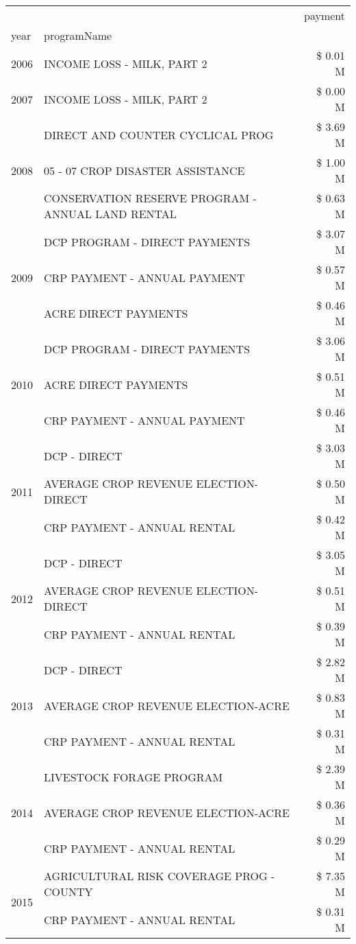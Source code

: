 \begin{tabular}{llr}
\toprule
 &  & payment \\
year & programName &  \\
\midrule
2006 & INCOME LOSS - MILK, PART 2 & \$ 0.01 M \\
\cline{1-3}
2007 & INCOME LOSS - MILK, PART 2 & \$ 0.00 M \\
\cline{1-3}
\multirow[t]{3}{*}{2008} & DIRECT AND COUNTER CYCLICAL PROG & \$ 3.69 M \\
 & 05 - 07 CROP DISASTER ASSISTANCE & \$ 1.00 M \\
 & CONSERVATION RESERVE PROGRAM - ANNUAL LAND RENTAL & \$ 0.63 M \\
\cline{1-3}
\multirow[t]{3}{*}{2009} & DCP PROGRAM - DIRECT PAYMENTS & \$ 3.07 M \\
 & CRP PAYMENT - ANNUAL PAYMENT & \$ 0.57 M \\
 & ACRE DIRECT PAYMENTS & \$ 0.46 M \\
\cline{1-3}
\multirow[t]{3}{*}{2010} & DCP PROGRAM - DIRECT PAYMENTS & \$ 3.06 M \\
 & ACRE DIRECT PAYMENTS & \$ 0.51 M \\
 & CRP PAYMENT - ANNUAL PAYMENT & \$ 0.46 M \\
\cline{1-3}
\multirow[t]{3}{*}{2011} & DCP - DIRECT & \$ 3.03 M \\
 & AVERAGE CROP REVENUE ELECTION-DIRECT & \$ 0.50 M \\
 & CRP PAYMENT - ANNUAL RENTAL & \$ 0.42 M \\
\cline{1-3}
\multirow[t]{3}{*}{2012} & DCP - DIRECT & \$ 3.05 M \\
 & AVERAGE CROP REVENUE ELECTION-DIRECT & \$ 0.51 M \\
 & CRP PAYMENT - ANNUAL RENTAL & \$ 0.39 M \\
\cline{1-3}
\multirow[t]{3}{*}{2013} & DCP - DIRECT & \$ 2.82 M \\
 & AVERAGE CROP REVENUE ELECTION-ACRE & \$ 0.83 M \\
 & CRP PAYMENT - ANNUAL RENTAL & \$ 0.31 M \\
\cline{1-3}
\multirow[t]{3}{*}{2014} & LIVESTOCK FORAGE PROGRAM & \$ 2.39 M \\
 & AVERAGE CROP REVENUE ELECTION-ACRE & \$ 0.36 M \\
 & CRP PAYMENT - ANNUAL RENTAL & \$ 0.29 M \\
\cline{1-3}
\multirow[t]{3}{*}{2015} & AGRICULTURAL RISK COVERAGE PROG - COUNTY & \$ 7.35 M \\
 & CRP PAYMENT - ANNUAL RENTAL & \$ 0.31 M \\

\end{tabular}
